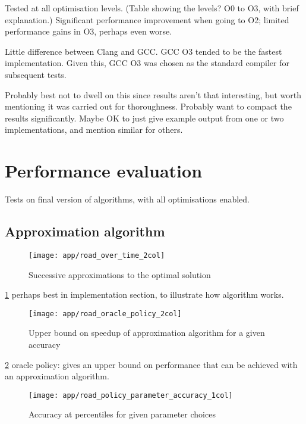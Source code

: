 Tested at all optimisation levels. (Table showing the levels? O0 to O3, with brief explanation.) Significant performance improvement when going to O2; limited performance gains in O3, perhaps even worse.

Little difference between Clang and GCC. GCC O3 tended to be the fastest implementation. Given this, GCC O3 was chosen as the standard compiler for subsequent tests.

Probably best not to dwell on this since results aren't that interesting, but worth mentioning it was carried out for thoroughness. Probably want to compact the results significantly. Maybe OK to just give example output from one or two implementations, and mention similar for others.

\section{Performance evaluation}

Tests on final version of algorithms, with all optimisations enabled.

\subsection{Approximation algorithm} \label{sec:eval-approx}


\begin{figure}
    \centering
    \texttt{[image: app/road\_over\_time\_2col]}
    \caption{Successive approximations to the optimal solution}
    \label{fig:app-cost-over-time}
\end{figure}

\cref{fig:app-cost-over-time} perhaps best in implementation section, to illustrate how algorithm works.

\begin{figure}
    \centering
    \texttt{[image: app/road\_oracle\_policy\_2col]}
    \caption{Upper bound on speedup of approximation algorithm for a given accuracy}
    \label{fig:app-oracle-policy}
\end{figure}

\cref{fig:app-oracle-policy} oracle policy: gives an upper bound on performance that can be achieved with an approximation algorithm.

\begin{figure}
    \centering
    \texttt{[image: app/road\_policy\_parameter\_accuracy\_1col]}
    \caption{Accuracy at percentiles for given parameter choices}
    \label{fig:app-policy-parameter-accuracy}
\end{figure}

